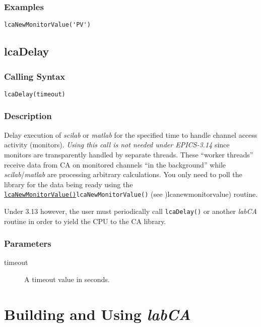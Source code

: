 \documentclass{article}
\newcommand{\sca}{\ita{labCA}}
\newcommand{\scilab}{\ita{scilab}}
\newcommand{\matlab}{\ita{matlab}}
\newcommand{\com}[1]{{\tt #1}}
\newcommand{\pbrk}{\pagebreak[3]}
\newcommand{\pbrkf}{\pagebreak}
\newcommand{\comref}[2]{\hyperref[ref]{\com{#1}}{\com{#1} (see }{)}{#2}}
\newcommand{\ita}[1]{\emph{#1}}
\renewcommand{\pbrk}{}
\renewcommand{\pbrkf}{}
\begin{document}
\subsubsection{Examples}
\begin{verbatim}
lcaNewMonitorValue('PV')
\end{verbatim}

\pbrk
\subsection{lcaDelay}
\label{lcadelay}
\subsubsection{Calling Syntax}
\begin{verbatim}
lcaDelay(timeout)
\end{verbatim}
\subsubsection{Description}
Delay execution of \scilab{} or \matlab{} for the specified time
to handle channel access activity (monitors). 
{\em Using this call is not needed under EPICS-3.14} since monitors
are transparently handled by separate threads. These ``worker threads''
receive data from CA on monitored channels ``in the background'' while
\scilab{}/\matlab{} are processing arbitrary calculations.
You only need to poll the library for the data being ready using the
\comref{lcaNewMonitorValue()}{lcanewmonitorvalue}) routine.

Under 3.13 however, the user must periodically call {\tt lcaDelay()} or
another  \sca{} routine in order to yield the CPU to the CA
library.
\subsubsection{Parameters}
\begin{description}
\item[timeout]
A timeout value in seconds.
\end{description}

\pbrkf
\section{Building and Using \sca{}}
\end{document}
